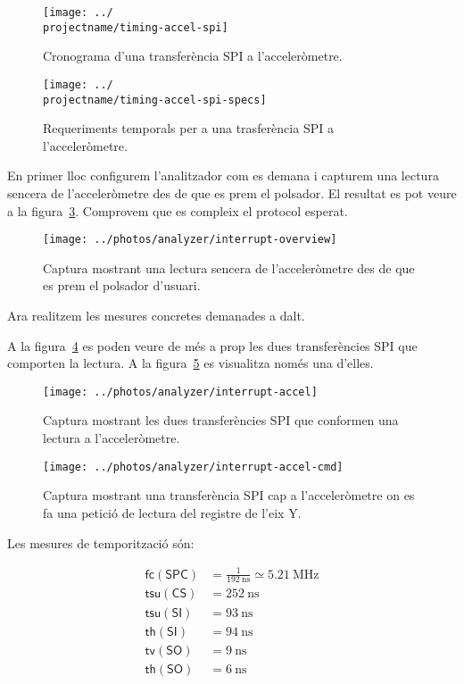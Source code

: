 \begin{figure}
  \texttt{[image: ../\\projectname/timing-accel-spi]}
  \caption{ \label{fig:p4-timing-accel} Cronograma d'una transferència SPI a l'acceleròmetre. }
\end{figure}

\begin{figure}
  \texttt{[image: ../\\projectname/timing-accel-spi-specs]}
  \caption{ \label{fig:p4-timing-accel-specs} Requeriments temporals per a una trasferència SPI a l'acceleròmetre. }
\end{figure}

En primer lloc configurem l'analitzador com es demana i capturem una lectura sencera de
l'acceleròmetre des de que es prem el polsador.
El resultat es pot veure a la figura~\ref{fig:p4-analyzer-overview}.
Comprovem que es compleix el protocol esperat.

\begin{figure}
  \texttt{[image: ../photos/analyzer/interrupt-overview]}
  \caption{ \label{fig:p4-analyzer-overview} Captura mostrant una lectura sencera de l'acceleròmetre des de que es prem el polsador d'usuari. }
\end{figure}

Ara realitzem les mesures concretes demanades a dalt.

A la figura~\ref{fig:p4-analyzer-transfers}
es poden veure de més a prop les dues transferències SPI que comporten la lectura.
A la figura~\ref{fig:p4-analyzer-cmd} es visualitza només una d'elles.

\begin{figure}
  \texttt{[image: ../photos/analyzer/interrupt-accel]}
  \caption{ \label{fig:p4-analyzer-transfers} Captura mostrant les dues transferències SPI que conformen una lectura a l'acceleròmetre. }
\end{figure}

\begin{figure}
  \texttt{[image: ../photos/analyzer/interrupt-accel-cmd]}
  \caption{ \label{fig:p4-analyzer-cmd} Captura mostrant una transferència SPI cap a l'acceleròmetre on es fa una petició de lectura del registre de l'eix Y. }
\end{figure}

Les mesures de temporització són:

\begin{align*}
  \mathsf{fc(SPC)} &= \frac{1}{\SI{192}{\nano\second}} \simeq \SI{5.21}{\mega\hertz}
\\
  \mathsf{tsu(CS)} &= \SI{252}{\nano\second}
\\
  \mathsf{tsu(SI)} &= \SI{93}{\nano\second}
\\
  \mathsf{th(SI)} &= \SI{94}{\nano\second}
\\
  \mathsf{tv(SO)} &= \SI{9}{\nano\second}
\\
  \mathsf{th(SO)} &= \SI{6}{\nano\second}
\end{align*}

